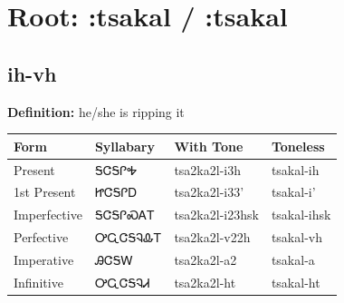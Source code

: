 \documentclass{article}%
\begin{document}
%
\normalsize%
\section*{Root: :tsakal / :tsakal}%
\subsection*{ih-vh}%
\textbf{Definition: }%
he/she is ripping it%
\\[0.5em]%
\begin{tabular}{|l|l|l|l|}%
\hline%
\textbf{Form}&\textbf{Syllabary}&\textbf{With Tone}&\textbf{Toneless}\\%
\hline%
Present&ᎦᏣᎦᎵᎭ&tsa2ka2l{-}i3h&tsakal{-}ih\\%
1st Present&ᏥᏣᎦᎵᎠ&tsa2ka2l{-}i33'&tsakal{-}i'\\%
Imperfective&ᎦᏣᎦᎵᏍᎪᎢ&tsa2ka2l{-}i23hsk&tsakal{-}ihsk\\%
Perfective&ᎤᏩᏣᎦᎸᎲᎢ&tsa2ka2l{-}v22h&tsakal{-}vh\\%
Imperative&ᎯᏣᎦᎳ&tsa2ka2l{-}a2&tsakal{-}a\\%
Infinitive&ᎤᏩᏣᎦᎸᏗ&tsa2ka2l{-}ht&tsakal{-}ht\\%
\hline%
\end{tabular}%
\\[1em]%
\end{document}
